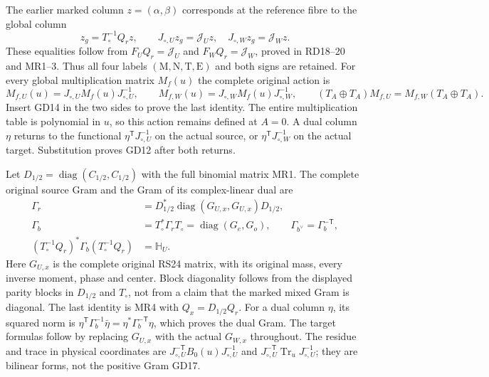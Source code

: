 The earlier marked column $z=(\alpha,\beta)$ corresponds
at the reference fibre to the global column
\begin{equation}
 z_g=T_\circ^{-1}Q_rz,\qquad
 J_{\circ,U}z_g=\mathcal J_Uz,\quad
 J_{\circ,W}z_g=\mathcal J_Wz.
 \tag{GD15}
\end{equation}
These equalities follow from $F_UQ_r=\mathcal J_U$
and $F_WQ_r=\mathcal J_W$, proved in RD18--20 and
MR1--3. Thus all four labels $(\mathrm M,\mathrm N,
\mathrm T,\mathrm E)$ and both signs are retained.
For every global multiplication matrix $M_f(u)$ the
complete original action is
\begin{equation}
 M_{f,U}(u)=J_{\circ,U}M_f(u)J_{\circ,U}^{-1},\qquad
 M_{f,W}(u)=J_{\circ,W}M_f(u)J_{\circ,W}^{-1},\qquad
 (T_A\oplus T_A)M_{f,U}=M_{f,W}(T_A\oplus T_A).
 \tag{GD16}
\end{equation}
Insert GD14 in the two sides to prove the last identity.
The entire multiplication table is polynomial in $u$,
so this action remains defined at $A=0$. A dual column
$\eta$ returns to the functional
$\eta^{\mathsf T}J_{\circ,U}^{-1}$ on the actual source,
or $\eta^{\mathsf T}J_{\circ,W}^{-1}$ on the actual
target. Substitution proves GD12 after both returns.

Let $D_{1/2}=\operatorname{diag}(C_{1/2},C_{1/2})$ with
the full binomial matrix MR1. The complete original
source Gram and the Gram of its complex-linear dual are
\begin{equation}
\begin{aligned}
 \Gamma_r&=D_{1/2}^*\operatorname{diag}(G_{U,x},G_{U,x})D_{1/2},\\
 \Gamma_b&=T_\circ^*\Gamma_rT_\circ
                 =\operatorname{diag}(G_e,G_o),\qquad
 \Gamma_{b^\vee}=\Gamma_b^{-\mathsf T},\\
 (T_\circ^{-1}Q_r)^*\Gamma_b(T_\circ^{-1}Q_r)&=\mathbb H_U.
\end{aligned}\tag{GD17}
\end{equation}
Here $G_{U,x}$ is the complete original RS24 matrix,
with its original mass, every inverse moment, phase
and center. Block diagonality follows from the displayed
parity blocks in $D_{1/2}$ and $T_\circ$, not from a
claim that the marked mixed Gram is diagonal. The last
identity is MR4 with $Q_x=D_{1/2}Q_r$. For a dual column
$\eta$, its squared norm is
$\eta^{\mathsf T}\Gamma_b^{-1}\bar\eta
 =\eta^*\Gamma_b^{-\mathsf T}\eta$, which proves
the dual Gram. The target formulas follow by replacing
$G_{U,x}$ with the actual $G_{W,x}$ throughout.
The residue and trace in physical coordinates are
$J_{\circ,U}^{-\mathsf T}B_0(u)J_{\circ,U}^{-1}$ and
$J_{\circ,U}^{-\mathsf T}\operatorname{Tr}_uJ_{\circ,U}^{-1}$;
they are bilinear forms, not the positive Gram GD17.

